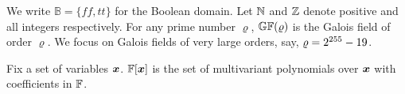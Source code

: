 
We write $\mathbb{B} = \{ \mathit{ff}, \mathit{tt} \}$ for the Boolean
domain. 
Let $\mathbb{N}$ and $\mathbb{Z}$ denote positive and all integers
respectively. For any prime number $\varrho$, $\mathbb{GF}(\varrho)$ is the
Galois field of order $\varrho$. We focus on Galois fields of very
large orders, say, $\varrho = 2^{255} - 19$. 

Fix a set of variables $\vx$. $\bbfF[\vx]$ is the set of multivariant
polynomials over $\vx$ with coefficients in $\mathbb{F}$. 
